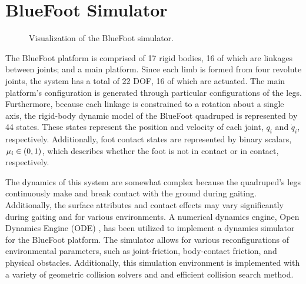 	\section{BlueFoot Simulator}
%
		\begin{figure}[h!]
			\centering
			\caption{Visualization of the BlueFoot simulator.}
			\label{fig::simulator_wide}
		\end{figure}
%
		The BlueFoot platform is comprised of 17 rigid bodies, 16 of which are linkages between joints; and a main platform. Since each limb is formed from four revolute joints, the system has a total of 22 DOF, 16 of which are actuated. The main platform's configuration is generated through particular configurations of the legs. Furthermore, because each linkage is constrained to a rotation about a single axis, the rigid-body dynamic model of the BlueFoot quadruped is represented by 44 states. These states represent the position and velocity of each joint, $q_{i}$ and $\dot{q}_{i}$, respectively. Additionally, foot contact states are represented by binary scalars, $\mu_{i} \in \left(0,1\right)$, which describes whether the foot is not in contact or in contact, respectively.

		The dynamics of this system are somewhat complex because the quadruped's legs continuously make and break contact with the ground during gaiting. Additionally, the surface attributes and contact effects may vary significantly during gaiting and for various environments. A numerical dynamics engine, Open Dynamics Engine (ODE) \cite{ODE_Website}, has been utilized to implement a dynamics simulator for the BlueFoot platform. The simulator allows for various reconfigurations of environmental parameters, such as joint-friction, body-contact friction, and physical obstacles. Additionally, this simulation environment is implemented with a variety of geometric collision solvers and and efficient collision search method.

